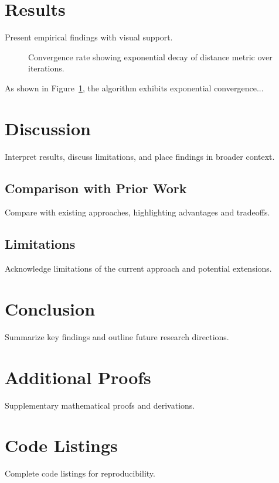 \documentclass[11pt,letterpaper]{article}
\begin{document}
\section{Results}

Present empirical findings with visual support.

\begin{figure}[htbp]
\centering

\caption{Convergence rate showing exponential decay of distance metric 
over iterations.}
\label{fig:convergence}
\end{figure}

As shown in Figure~\ref{fig:convergence}, the algorithm exhibits 
exponential convergence...

\section{Discussion}

Interpret results, discuss limitations, and place findings in broader context.

\subsection{Comparison with Prior Work}

Compare with existing approaches, highlighting advantages and tradeoffs.

\subsection{Limitations}

Acknowledge limitations of the current approach and potential extensions.

\section{Conclusion}

Summarize key findings and outline future research directions.




\appendix

\section{Additional Proofs}

Supplementary mathematical proofs and derivations.

\section{Code Listings}

Complete code listings for reproducibility.
\end{document}
